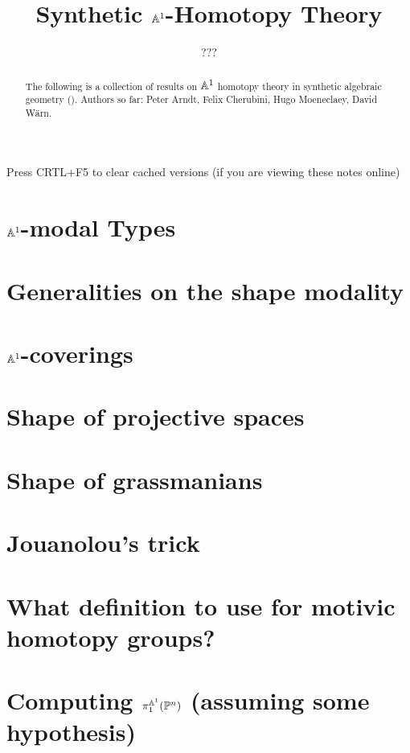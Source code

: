\documentclass{../util/zariski}
\title{Synthetic $\mathbb{A}^1$-Homotopy Theory}
\author{???}
\begin{document}
\maketitle

\begin{center}
  \color{purple}
  \large{Press CRTL+F5 to clear cached versions}
  \large{(if you are viewing these notes online)}
\end{center}

\begin{abstract}
  The following is a collection of results on $\mathbb{A}^1$ homotopy theory in synthetic algebraic geometry (\cite{draft}).
  Authors so far: Peter Arndt, Felix Cherubini, Hugo Moeneclaey, David Wärn. 
\end{abstract}

\tableofcontents

\section[A1-modal types]{$\mathbb{A}^1$-modal Types}


%

\section{Generalities on the shape modality}


\section{$\mathbb{A}^1$-coverings}


\section{Shape of projective spaces}


\section{Shape of grassmanians}


\section{Jouanolou's trick}


\section{What definition to use for motivic homotopy groups?}


\section{Computing $\pi_1^{\mathbb{A}^1}(\mathbb{P}^n)$ (assuming some hypothesis)}


\printindex

\printbibliography
\end{document}

